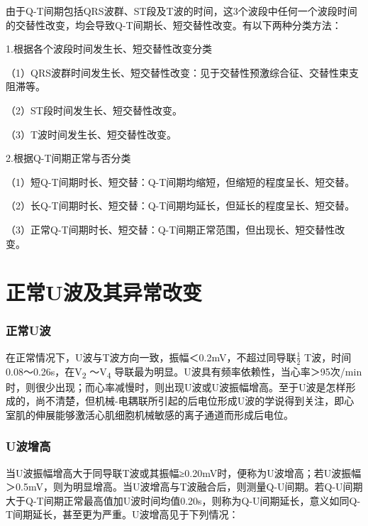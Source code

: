 由于Q-T间期包括QRS波群、ST段及T波的时间，这3个波段中任何一个波段时间的交替性改变，均会导致Q-T间期长、短交替性改变。有以下两种分类方法：

1.根据各个波段时间发生长、短交替性改变分类

（1）QRS波群时间发生长、短交替性改变：见于交替性预激综合征、交替性束支阻滞等。

（2）ST段时间发生长、短交替性改变。

（3）T波时间发生长、短交替性改变。

2.根据Q-T间期正常与否分类

（1）短Q-T间期时长、短交替：Q-T间期均缩短，但缩短的程度呈长、短交替。

（2）长Q-T间期时长、短交替：Q-T间期均延长，但延长的程度呈长、短交替。

（3）正常Q-T间期时长、短交替：Q-T间期正常范围，但出现长、短交替性改变。

\protect\hypertarget{text00014.html}{}{}

\protect\hypertarget{text00014.htmlux5cux23chapter14}{}{}

\chapter{正常U波及其异常改变}

\protect\hypertarget{text00014.htmlux5cux23subid109}{}{}

\subsection{正常U波}

在正常情况下，U波与T波方向一致，振幅＜0.2mV，不超过同导联$\frac{1}{2}$
T波，时间0.08～0.26s，在V\textsubscript{2} ～V\textsubscript{4}
导联最为明显。U波具有频率依赖性，当心率＞95次/min时，则很少出现；而心率减慢时，则出现U波或U波振幅增高。至于U波是怎样形成的，尚不清楚，但机械-电耦联所引起的后电位形成U波的学说得到关注，即心室肌的伸展能够激活心肌细胞机械敏感的离子通道而形成后电位。

\protect\hypertarget{text00014.htmlux5cux23subid110}{}{}

\subsection{U波增高}

当U波振幅增高大于同导联T波或其振幅≥0.20mV时，便称为U波增高；若U波振幅＞0.5mV，则为明显增高。当U波增高与T波融合后，则测量Q-U间期。若Q-U间期大于Q-T间期正常最高值加U波时间均值0.20s，则称为Q-U间期延长，意义如同Q-T间期延长，甚至更为严重。U波增高见于下列情况：


